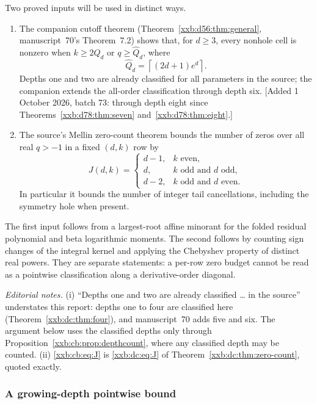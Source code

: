 \documentclass[11pt,a4paper]{article}
\numberwithin{equation}{section}
\theoremstyle{definition}
\theoremstyle{remark}
\theoremstyle{plain}
\begin{document}
Two proved inputs will be used in distinct ways.
\begin{enumerate}[leftmargin=1.8em,itemsep=2pt]
\item The companion cutoff theorem (Theorem~\ref{xxb:d56:thm:general},
 manuscript~70's Theorem~7.2) shows that, for $d\ge3$, every nonhole cell is
 nonzero when $k\ge2\widehat Q_d$ or $q\ge\widehat Q_d$, where
\begin{equation}\label{xxb:cb:eq:Q}
 \widehat Q_d=\left\lceil(2d+1)e^d\right\rceil.
\end{equation}
Depths one and two are already classified for all parameters in the source;
the companion extends the all-order classification through depth six.
[Added 1 October 2026, batch 73: through depth eight since Theorems~\ref{xxb:d78:thm:seven}
and~\ref{xxb:d78:thm:eight}.]
\item The source's Mellin zero-count theorem bounds the number of zeros over all
real $q>-1$ in a fixed $(d,k)$ row by
\begin{equation}\label{xxb:cb:eq:J}
 J(d,k)=
 \begin{cases}
 d-1,&k\text{ even},\\
 d,&k\text{ odd and }d\text{ odd},\\
 d-2,&k\text{ odd and }d\text{ even}.
 \end{cases}
\end{equation}
In particular it bounds the number of integer tail cancellations, including the
symmetry hole when present.
\end{enumerate}
The first input follows from a largest-root affine minorant for the folded
residual polynomial and beta logarithmic moments. The second follows by
counting sign changes of the integral kernel and applying the Chebyshev
property of distinct real powers. They are separate statements: a per-row zero
budget cannot be read as a pointwise classification along a derivative-order
diagonal.

\emph{Editorial notes.}  (i) ``Depths one and two are already classified
\ldots{} in the source'' understates this report: depths one to four are
classified here (Theorem~\ref{xxb:dc:thm:four}), and manuscript~70 adds five
and six.  The argument below uses the classified depths only through
Proposition~\ref{xxb:cb:prop:depthcount}, where any classified depth may be
counted.  (ii) \eqref{xxb:cb:eq:J} is \eqref{xxb:dc:eq:J} of
Theorem~\ref{xxb:dc:thm:zero-count}, quoted exactly.

\subsubsection{A growing-depth pointwise bound}
\end{document}
